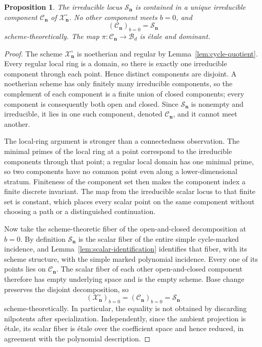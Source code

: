\documentclass[11pt]{article}
\newtheorem{proposition}[theorem]{Proposition}
\theoremstyle{definition}
\theoremstyle{remark}
\newcommand{\cB}{\mathcal B}
\newcommand{\cC}{\mathcal C}
\newcommand{\cS}{\mathcal S}
\newcommand{\cX}{\mathcal X}
\newcommand{\bn}{\mathbf n}
\begin{document}
\begin{proposition}
\label{prop:unique-component}
The irreducible locus $\cS_{\bn}$ is contained in a unique irreducible
component $\cC_{\bn}$ of $\cX_{\bn}^{\circ}$.  No other component meets
$b=0$, and
\[
  (\cC_{\bn})_{b=0}=\cS_{\bn}
\]
scheme-theoretically.  The map
$\pi:\cC_{\bn}\to\cB_d$ is étale and dominant.
\end{proposition}

\begin{proof}
The scheme $\cX_{\bn}^{\circ}$ is noetherian and regular by
Lemma~\ref{lem:cycle-quotient}.  Every regular local ring is a domain, so
there is exactly one irreducible component through each point.  Hence
distinct components are disjoint.  A noetherian scheme has only finitely
many irreducible components, so the complement of each component is a
finite union of closed components; every component is consequently both
open and closed.  Since $\cS_{\bn}$ is nonempty and irreducible, it lies in
one such component, denoted $\cC_{\bn}$, and it cannot meet another.

The local-ring argument is stronger than a connectedness observation.  The
minimal primes of the local ring at a point correspond to the irreducible
components through that point; a regular local domain has one minimal prime,
so two components have no common point even along a lower-dimensional
stratum.  Finiteness of the component set then makes the component index a
finite discrete invariant.  The map from the irreducible scalar locus to
that finite set is constant, which places every scalar point on the same
component without choosing a path or a distinguished continuation.

Now take the scheme-theoretic fiber of the open-and-closed decomposition at
$b=0$.  By definition $\cS_{\bn}$ is the scalar fiber of the entire simple
cycle-marked incidence, and Lemma~\ref{lem:scalar-identification} identifies
that fiber, with its scheme structure, with the simple marked polynomial
incidence.  Every one of its points lies on $\cC_{\bn}$.  The scalar fiber of
each other open-and-closed component therefore has empty underlying space
and is the empty scheme.  Base change preserves the disjoint decomposition,
so
\[
  (\cX_{\bn}^{\circ})_{b=0}
  =(\cC_{\bn})_{b=0}
  =\cS_{\bn}
\]
scheme-theoretically.  In particular, the equality is not obtained by
discarding nilpotents after specialization.  Independently, since the
ambient projection is étale, its scalar fiber is étale over the coefficient
space and hence reduced, in agreement with the polynomial description.


\end{proof}
\end{document}
